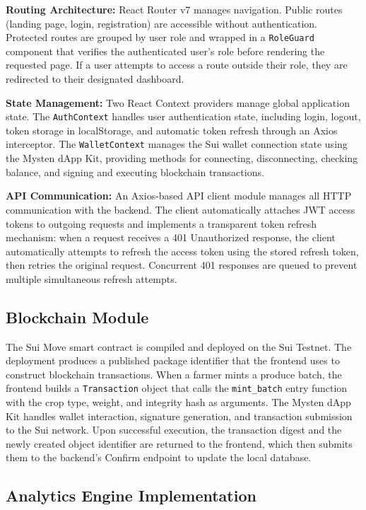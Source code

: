 \textbf{Routing Architecture:} React Router v7 manages navigation. Public routes (landing page, login, registration) are accessible without authentication. Protected routes are grouped by user role and wrapped in a \texttt{RoleGuard} component that verifies the authenticated user's role before rendering the requested page. If a user attempts to access a route outside their role, they are redirected to their designated dashboard.

\textbf{State Management:} Two React Context providers manage global application state. The \texttt{AuthContext} handles user authentication state, including login, logout, token storage in localStorage, and automatic token refresh through an Axios interceptor. The \texttt{WalletContext} manages the Sui wallet connection state using the Mysten dApp Kit, providing methods for connecting, disconnecting, checking balance, and signing and executing blockchain transactions.

\textbf{API Communication:} An Axios-based API client module manages all HTTP communication with the backend. The client automatically attaches JWT access tokens to outgoing requests and implements a transparent token refresh mechanism: when a request receives a 401 Unauthorized response, the client automatically attempts to refresh the access token using the stored refresh token, then retries the original request. Concurrent 401 responses are queued to prevent multiple simultaneous refresh attempts.

\subsection{Blockchain Module}

The Sui Move smart contract is compiled and deployed on the Sui Testnet. The deployment produces a published package identifier that the frontend uses to construct blockchain transactions. When a farmer mints a produce batch, the frontend builds a \texttt{Transaction} object that calls the \texttt{mint\_batch} entry function with the crop type, weight, and integrity hash as arguments. The Mysten dApp Kit handles wallet interaction, signature generation, and transaction submission to the Sui network. Upon successful execution, the transaction digest and the newly created object identifier are returned to the frontend, which then submits them to the backend's Confirm endpoint to update the local database.

\subsection{Analytics Engine Implementation}

